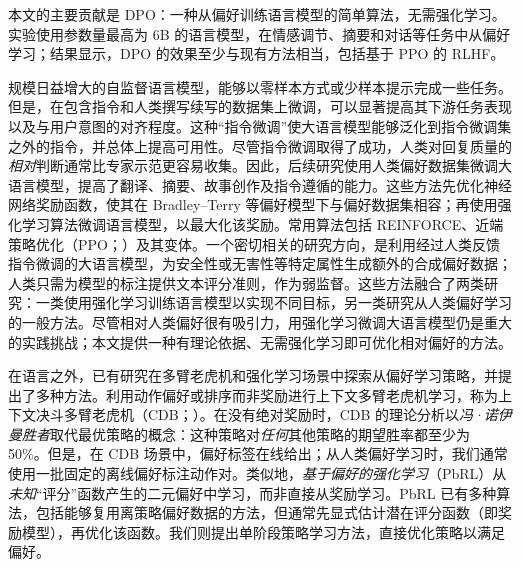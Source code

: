 本文的主要贡献是 DPO：一种从偏好训练语言模型的简单算法，无需强化学习。实验使用参数量最高为 6B 的语言模型，在情感调节、摘要和对话等任务中从偏好学习；结果显示，DPO 的效果至少与现有方法相当，包括基于 PPO 的 RLHF。








规模日益增大的自监督语言模型，能够以零样本方式\cite{dpo-radford2019language}或少样本提示\cite{dpo-gpt3,dpo-megatron,dpo-chowdhery2022palm}完成一些任务。但是，在包含指令和人类撰写续写的数据集上微调，可以显著提高其下游任务表现以及与用户意图的对齐程度\cite{dpo-mishra-etal-2022-cross,dpo-sanh2022multitask,dpo-chung2022scaling,dpo-thoppilan2022lamda}。这种“指令微调”使大语言模型能够泛化到指令微调集之外的指令，并总体上提高可用性\cite{dpo-chung2022scaling}。尽管指令微调取得了成功，人类对回复质量的\emph{相对}判断通常比专家示范更容易收集。因此，后续研究使用人类偏好数据集微调大语言模型，提高了翻译\cite{dpo-kreutzer-etal-2018-reliability}、摘要\cite{dpo-stiennon2022learning,dpo-ziegler2020finetuning}、故事创作\cite{dpo-ziegler2020finetuning}及指令遵循\cite{dpo-ouyang2022training,dpo-ramamurthy2023is}的能力。这些方法先优化神经网络奖励函数，使其在 Bradley--Terry 等偏好模型\cite{dpo-bradley1952rankanalysis}下与偏好数据集相容；再使用强化学习算法微调语言模型，以最大化该奖励。常用算法包括 REINFORCE\cite{dpo-williams1992reinforce}、近端策略优化（PPO；\cite{dpo-schulman2017proximal}）及其变体\cite{dpo-ramamurthy2023is}。一个密切相关的研究方向，是利用经过人类反馈指令微调的大语言模型，为安全性或无害性等特定属性生成额外的合成偏好数据\cite{dpo-bai2022constitutional}；人类只需为模型的标注提供文本评分准则，作为弱监督。这些方法融合了两类研究：一类使用强化学习训练语言模型以实现不同目标\cite{dpo-Ranzato2015SequenceLT,dpo-paulus2018a,dpo-wu2018learning}，另一类研究从人类偏好学习的一般方法\cite{dpo-christiano2017deep,dpo-kupcsik2018learning}。尽管相对人类偏好很有吸引力，用强化学习微调大语言模型仍是重大的实践挑战；本文提供一种有理论依据、无需强化学习即可优化相对偏好的方法。

在语言之外，已有研究在多臂老虎机和强化学习场景中探索从偏好学习策略，并提出了多种方法。利用动作偏好或排序而非奖励进行上下文多臂老虎机学习，称为上下文决斗多臂老虎机（CDB；\cite{dpo-yue2012karmed,dpo-dudik2015contextual}）。在没有绝对奖励时，CDB 的理论分析以\emph{冯·诺伊曼胜者}取代最优策略的概念：这种策略对\emph{任何}其他策略的期望胜率都至少为 50\%\cite{dpo-dudik2015contextual}。但是，在 CDB 场景中，偏好标签在线给出；从人类偏好学习时，我们通常使用一批固定的离线偏好标注动作对\cite{dpo-yan2022human}。类似地，\emph{基于偏好的强化学习}（PbRL）从\emph{未知}“评分”函数产生的二元偏好中学习，而非直接从奖励学习\cite{dpo-BusaFekete2014,dpo-ruiz2023dueling}。PbRL 已有多种算法，包括能够复用离策略偏好数据的方法，但通常先显式估计潜在评分函数（即奖励模型），再优化该函数\cite{dpo-jain2013learning,dpo-BusaFekete2014,dpo-christiano2017deep,dpo-sadigh2017active,dpo-kupcsik2018learning}。我们则提出单阶段策略学习方法，直接优化策略以满足偏好。



